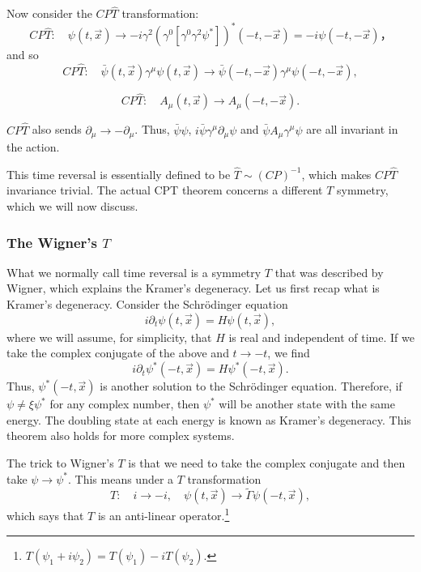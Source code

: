 \documentclass[11pt]{article}
\theoremstyle{definition}
\begin{document}
Now consider the $CP\hat{T}$ transformation:
\begin{equation}
    CP\hat{T}: \quad \psi(t,\vec{x}) \to -i\gamma^2(\gamma^0[\gamma^0\gamma^2\psi^*])^*(-t,-\vec{x}) = -i\psi(-t,-\vec{x})，
\end{equation}
and so
\begin{equation}
CP\hat{T} : \quad \bar{\psi}(t, \vec{x})\gamma^{\mu}\psi(t, \vec{x}) \rightarrow \bar{\psi}(-t, -\vec{x})\gamma^{\mu}\psi(-t, -\vec{x}),
\end{equation}

\begin{equation}
CP\hat{T} : \quad A_{\mu}(t, \vec{x}) \rightarrow A_{\mu}(-t, -\vec{x}).
\end{equation}

\(CP\hat{T}\) also sends \(\partial_{\mu} \rightarrow - \partial_{\mu}\). Thus, \(\bar{\psi}\psi\), \(i\bar{\psi}\gamma^{\mu}\partial_{\mu}\psi\) and \(\bar{\psi}A_{\mu}\gamma^{\mu}\psi\) are all invariant in the action.

This time reversal is essentially defined to be \(\hat{T} \sim (CP)^{-1}\), which makes \(CP\hat{T}\) invariance trivial. The actual CPT theorem concerns a different \(T\) symmetry, which we will now discuss.

\subsubsection{The Wigner's $T$}
What we normally call time reversal is a symmetry $T$ that was described by Wigner, which explains the Kramer's degeneracy. Let us first recap what is Kramer's degeneracy. Consider the Schrödinger equation
\begin{equation}
    i\partial_t\psi(t,\vec{x}) = H\psi(t,\vec{x}),
\end{equation}
where we will assume, for simplicity, that $H$ is real and independent of time. If we take the complex conjugate of the above and $t\to-t$, we find
\begin{equation}
    i\partial_t\psi^*(-t,\vec{x}) = H\psi^*(-t,\vec{x}).
\end{equation}
Thus, $\psi^*(-t,\vec{x})$ is another solution to the Schrödinger equation. Therefore, if $\psi\neq \xi\psi^*$ for any complex number, then $\psi^*$ will be another state with the same energy. The doubling state at each energy is known as Kramer's degeneracy. This theorem also holds for more complex systems. 

The trick to Wigner's $T$ is that we need to take the complex conjugate and then take $\psi\to\psi^*$. This means under a $T$ transformation
\begin{equation}
    T: \quad i\to -i, \quad \psi(t,\vec{x}) \to \tilde{\Gamma}\psi(-t,\vec{x}),
\end{equation}
which says that $T$ is an anti-linear operator.\footnote{$T(\psi_1+i\psi_2) = T(\psi_1)-iT(\psi_2).$}
\end{document}
